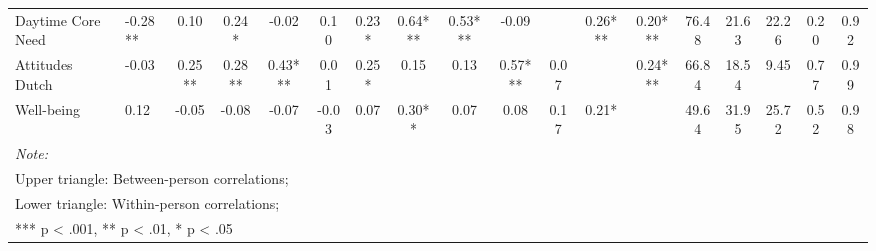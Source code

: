 \begin{table}
\begin{minipage}[t][\textheight][t]{\textwidth}
{\begin{tabular}[t]{llcccccccccccccccc}
Daytime Core Need & -0.28** & 0.10 & 0.24* & -0.02 & 0.10 & 0.23* & 0.64*** & 0.53*** & -0.09 &  & 0.26*** & 0.20*** & 76.48 & 21.63 & 22.26 & 0.20 & 0.92\\
\addlinespace
Attitudes Dutch & -0.03 & 0.25** & 0.28** & 0.43*** & 0.01 & 0.25* & 0.15 & 0.13 & 0.57*** & 0.07 &  & 0.24*** & 66.84 & 18.54 & 9.45 & 0.77 & 0.99\\
Well-being & 0.12 & -0.05 & -0.08 & -0.07 & -0.03 & 0.07 & 0.30** & 0.07 & 0.08 & 0.17 & 0.21* &  & 49.64 & 31.95 & 25.72 & 0.52 & 0.98\\
\bottomrule
\multicolumn{18}{l}{\rule{0pt}{1em}\textit{Note: }}\\
\multicolumn{18}{l}{\rule{0pt}{1em}Upper triangle: Between-person correlations;}\\
\multicolumn{18}{l}{\rule{0pt}{1em}Lower triangle: Within-person correlations;}\\
\multicolumn{18}{l}{\rule{0pt}{1em}*** p < .001, ** p < .01,  * p < .05}\\
\end{tabular}}
\end{minipage}
\end{table}
